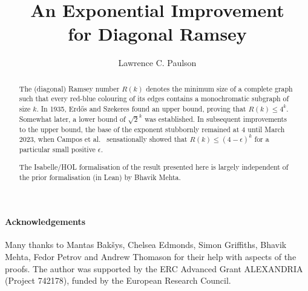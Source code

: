 \documentclass[11pt,a4paper]{article}
\begin{document}
\title{An Exponential Improvement\\ for Diagonal Ramsey}
\author{Lawrence C. Paulson}
\maketitle

\begin{abstract}

The (diagonal) Ramsey number $R(k)$ denotes the minimum size of a complete graph such that every red-blue colouring of its edges contains a monochromatic subgraph of size $k$.
In 1935, Erd\H{o}s and Szekeres found an upper bound, proving that $R(k)\le 4^k$. Somewhat later, a lower bound of $\sqrt{2}^k$ was established.
In subsequent improvements to the upper bound, the base of the exponent stubbornly 
remained at 4 until March 2023, when Campos et al.\ \cite{campos-exponential-ramsey}
sensationally showed that $R(k)\le (4-\epsilon)^k$ for a particular
small positive $\epsilon$.

The Isabelle/HOL formalisation of the result presented here is largely
independent of the prior formalisation (in Lean) by Bhavik Mehta.
\end{abstract}

\newpage
\tableofcontents

\paragraph*{Acknowledgements}
Many thanks to Mantas Bakšys, Chelsea Edmonds, Simon Griffiths, Bhavik Mehta, Fedor Petrov and Andrew Thomason for their help with aspects of the proofs.
The author was supported by the ERC Advanced Grant ALEXANDRIA (Project 742178), funded by the European Research Council. 

\newpage





\end{document}
